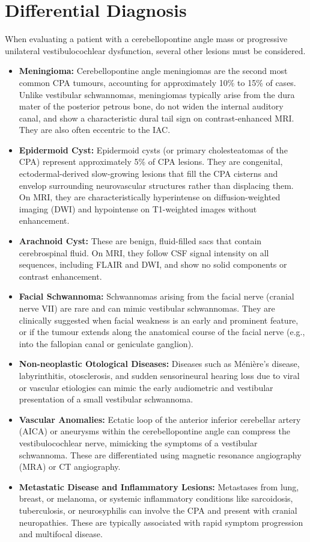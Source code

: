 \section*{Differential Diagnosis}
When evaluating a patient with a cerebellopontine angle mass or progressive unilateral vestibulocochlear dysfunction, several other lesions must be considered.
\begin{itemize}
    \item \textbf{Meningioma:} Cerebellopontine angle meningiomas are the second most common CPA tumours, accounting for approximately 10\% to 15\% of cases. Unlike vestibular schwannomas, meningiomas typically arise from the dura mater of the posterior petrous bone, do not widen the internal auditory canal, and show a characteristic dural tail sign on contrast-enhanced MRI. They are also often eccentric to the IAC.
    \item \textbf{Epidermoid Cyst:} Epidermoid cysts (or primary cholesteatomas of the CPA) represent approximately 5\% of CPA lesions. They are congenital, ectodermal-derived slow-growing lesions that fill the CPA cisterns and envelop surrounding neurovascular structures rather than displacing them. On MRI, they are characteristically hyperintense on diffusion-weighted imaging (DWI) and hypointense on T1-weighted images without enhancement.
    \item \textbf{Arachnoid Cyst:} These are benign, fluid-filled sacs that contain cerebrospinal fluid. On MRI, they follow CSF signal intensity on all sequences, including FLAIR and DWI, and show no solid components or contrast enhancement.
    \item \textbf{Facial Schwannoma:} Schwannomas arising from the facial nerve (cranial nerve VII) are rare and can mimic vestibular schwannomas. They are clinically suggested when facial weakness is an early and prominent feature, or if the tumour extends along the anatomical course of the facial nerve (e.g., into the fallopian canal or geniculate ganglion).
    \item \textbf{Non-neoplastic Otological Diseases:} Diseases such as M\'{e}ni\`{e}re's disease, labyrinthitis, otosclerosis, and sudden sensorineural hearing loss due to viral or vascular etiologies can mimic the early audiometric and vestibular presentation of a small vestibular schwannoma.
    \item \textbf{Vascular Anomalies:} Ectatic loop of the anterior inferior cerebellar artery (AICA) or aneurysms within the cerebellopontine angle can compress the vestibulocochlear nerve, mimicking the symptoms of a vestibular schwannoma. These are differentiated using magnetic resonance angiography (MRA) or CT angiography.
    \item \textbf{Metastatic Disease and Inflammatory Lesions:} Metastases from lung, breast, or melanoma, or systemic inflammatory conditions like sarcoidosis, tuberculosis, or neurosyphilis can involve the CPA and present with cranial neuropathies. These are typically associated with rapid symptom progression and multifocal disease.
\end{itemize}

